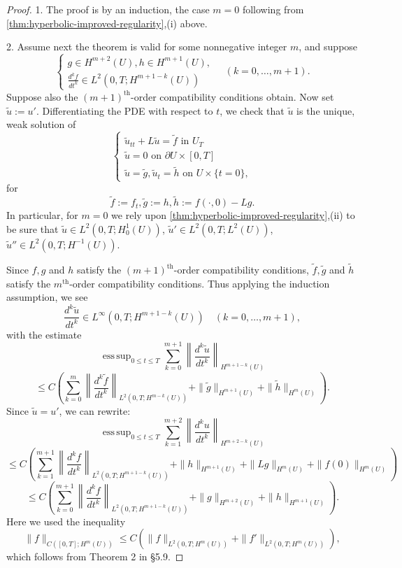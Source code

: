 \begin{proof}
1. The proof is by an induction, the case $m = 0$ following from \cref{thm:hyperbolic-improved-regularity},(i) above.

2. Assume next the theorem is valid for some nonnegative integer $m$, and suppose
\[
\begin{cases} g \in H^{m+2}(U), h \in H^{m+1}(U), \\ \frac{d^k f}{dt^k} \in L^2(0, T; H^{m+1-k}(U)) \end{cases} \quad (k = 0, \ldots, m + 1).
\tag{67}
\]
Suppose also the $(m+1)^{\text{th}}$-order compatibility conditions obtain. Now set $\tilde{u} := u'$. Differentiating the PDE with respect to $t$, we check that $\tilde{u}$ is the unique, weak solution of
\[
\begin{cases} \tilde{u}_{tt} + L\tilde{u} = \tilde{f} \text{ in } U_T \\ \tilde{u} = 0 \text{ on } \partial U \times [0,T] \\ \tilde{u} = \tilde{g}, \tilde{u}_t = \tilde{h} \text{ on } U \times \{t = 0\}, \end{cases}
\tag{68}
\]
for
\[
\tilde{f} := f_t, \tilde{g} := h, \tilde{h} := f(\cdot, 0) - Lg.
\tag{69}
\]
In particular, for $m = 0$ we rely upon \cref{thm:hyperbolic-improved-regularity},(ii) to be sure that $\tilde{u} \in L^2(0, T; H_0^1(U))$, $\tilde{u}' \in L^2(0, T; L^2(U))$, $\tilde{u}'' \in L^2(0, T; H^{-1}(U))$.

Since $f, g$ and $h$ satisfy the $(m+1)^{\text{th}}$-order compatibility conditions, $\tilde{f}, \tilde{g}$ and $\tilde{h}$ satisfy the $m^{\text{th}}$-order compatibility conditions. Thus applying the induction assumption, we see
\[
\frac{d^k\tilde{u}}{dt^k} \in L^\infty(0, T; H^{m+1-k}(U)) \quad (k = 0, \ldots, m+1),
\]
with the estimate
\[
\operatorname{ess\,sup}_{0 \leq t \leq T} \sum_{k=0}^{m+1} \left\| \frac{d^k\tilde{u}}{dt^k} \right\|_{H^{m+1-k}(U)}
\]
\[
\leq C \left( \sum_{k=0}^{m} \left\| \frac{d^k\tilde{f}}{dt^k} \right\|_{L^2(0,T;H^{m-k}(U))} + \|\tilde{g}\|_{H^{m+1}(U)} + \|\tilde{h}\|_{H^m(U)} \right).
\]
Since $\tilde{u} = u'$, we can rewrite:
\[
\operatorname{ess\,sup}_{0\leq t \leq T} \sum_{k=1}^{m+2} \left\|\frac{d^k u}{dt^k}\right\|_{H^{m+2-k}(U)}
\]
\[
\leq C\left(\sum_{k=1}^{m+1} \left\|\frac{d^k f}{dt^k}\right\|_{L^2(0,T;H^{m+1-k}(U))} + \|h\|_{H^{m+1}(U)} + \|Lg\|_{H^m(U)} + \|f(0)\|_{H^m(U)}\right)
\]
\[
\leq C\left(\sum_{k=0}^{m+1} \left\|\frac{d^k f}{dt^k}\right\|_{L^2(0,T;H^{m+1-k}(U))} + \|g\|_{H^{m+2}(U)} + \|h\|_{H^{m+1}(U)}\right).
\tag{70}
\]
Here we used the inequality
\[
\|f\|_{C([0,T];H^m(U))} \leq C(\|f\|_{L^2(0,T;H^m(U))} + \|f'\|_{L^2(0,T;H^m(U))}),
\]
which follows from Theorem 2 in \S5.9.


\end{proof}
